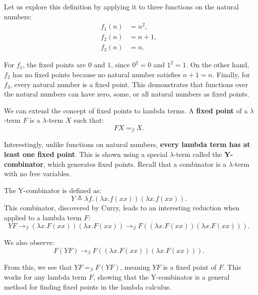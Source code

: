 \documentclass{article}
\begin{document}
Let us explore this definition by applying it to three functions on the natural numbers:
\[
\begin{aligned}
    f_1(n) &= n^2, \\
    f_2(n) &= n + 1, \\
    f_3(n) &= n.
\end{aligned}
\]

For $f_1$, the fixed points are $0$ and $1$, since $0^2 = 0$ and $1^2 = 1$. On the other hand, $f_2$ has no fixed points because no natural number satisfies $n + 1 = n$. Finally, for $f_3$, every natural number is a fixed point. This demonstrates that functions over the natural numbers can have zero, some, or all natural numbers as fixed points.

We can extend the concept of fixed points to lambda terms. A \textbf{fixed point} of a $\lambda$-term $F$ is a $\lambda$-term $X$ such that:
\[
FX =_\beta X.
\]

Interestingly, unlike functions on natural numbers, \textbf{every lambda term has at least one fixed point}. This is shown using a special $\lambda$-term called the \textbf{Y-combinator}, which generates fixed points. Recall that a combinator is a $\lambda$-term with no free variables.

The Y-combinator is defined as:
\[
Y \triangleq \lambda f.(\lambda x.f(xx))(\lambda x.f(xx)).
\]
This combinator, discovered by Curry, leads to an interesting reduction when applied to a lambda term $F$:
\[
YF \to_\beta (\lambda x.F(xx))(\lambda x.F(xx)) \to_\beta F((\lambda x.F(xx))(\lambda x.F(xx))).
\]

We also observe:
\[
F(YF) \to_\beta F((\lambda x.F(xx))(\lambda x.F(xx))).
\]

From this, we see that $YF =_\beta F(YF)$, meaning $YF$ is a fixed point of $F$. This works for any lambda term $F$, showing that the Y-combinator is a general method for finding fixed points in the lambda calculus.
\end{document}
